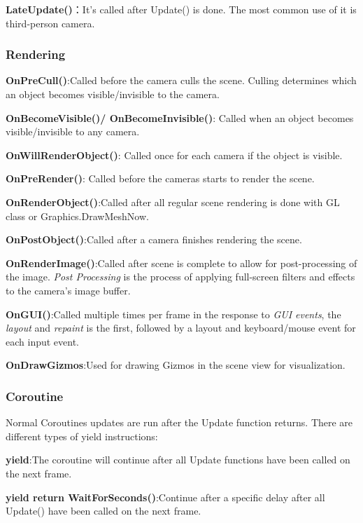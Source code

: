 \documentclass[10pt, a4paper]{article}
\begin{document}
                \textbf{LateUpdate()}：It's called after Update() is done. The most common use of it is third-person camera.

            \subsubsection{Rendering}
                \textbf{OnPreCull()}:Called before the camera culls the scene. Culling determines which an object becomes visible/invisible to the camera. 
                
                \textbf{OnBecomeVisible()/ OnBecomeInvisible()}: Called when an object becomes visible/invisible to any camera. 

                \textbf{OnWillRenderObject()}: Called once for each camera if the object is visible. 

                \textbf{OnPreRender()}: Called before the cameras starts to render the scene. 
                
                \textbf{OnRenderObject()}:Called after all regular scene rendering is done with GL class or Graphics.DrawMeshNow. 
                
                \textbf{OnPostObject()}:Called after a camera finishes rendering the scene. 

                \textbf{OnRenderImage()}:Called after scene is complete to allow for post-processing of the image. \emph{Post Processing} is the process of applying full-screen filters and effects to the camera's image buffer.
                
                \textbf{OnGUI()}:Called multiple times per frame in the response to \emph{GUI events}, the \emph{layout} and \emph{repaint} is the first, followed by a layout and keyboard/mouse event for each input event. 
                
                \textbf{OnDrawGizmos}:Used for drawing Gizmos in the scene view for visualization.
            \subsubsection{Coroutine}
                Normal Coroutines updates are run after the Update function returns. There are different types of yield instructions: 
                
                \textbf{yield}:The coroutine will continue after all Update functions have been called on the next frame.

                \textbf{yield return WaitForSeconds()}:Continue after a specific delay after all Update() have been called on the next frame. 
\end{document}
